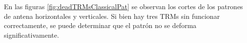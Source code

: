 En las figuras \ref{fig:deadTRMsClassicalPat} se observan los cortes de los patrones de antena horizontales y 
verticales. Si bien hay tres TRMs sin funcionar correctamente, se puede determinar que el patrón no se deforma 
significativamente. 
\begin{figure}[H]
	\centering
 	


\end{figure}
